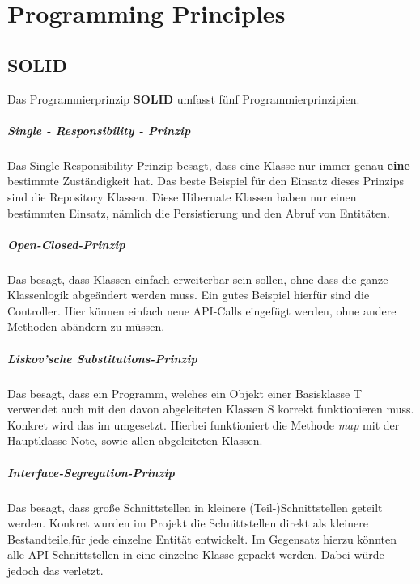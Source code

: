 \chapter{Programming Principles}

	\section{SOLID}
		Das Programmierprinzip \textbf{SOLID} umfasst fünf Programmierprinzipien.
		\paragraph{Single - Responsibility - Prinzip}
		Das Single-Responsibility Prinzip besagt, dass eine Klasse nur immer genau \textbf{eine} bestimmte Zuständigkeit hat. Das beste Beispiel für den Einsatz dieses Prinzips sind die Repository Klassen. Diese Hibernate Klassen haben nur einen bestimmten Einsatz, nämlich die Persistierung und den Abruf von Entitäten.
		\paragraph{Open-Closed-Prinzip}
		Das  besagt, dass Klassen einfach erweiterbar sein sollen, ohne dass die ganze Klassenlogik abgeändert werden muss. Ein gutes Beispiel hierfür sind die Controller. Hier können einfach neue API-Calls eingefügt werden, ohne andere Methoden abändern zu müssen.
		\paragraph{Liskov’sche Substitutions-Prinzip}
		Das  besagt, dass ein Programm, welches ein Objekt einer Basisklasse T verwendet auch mit den davon abgeleiteten Klassen S korrekt funktionieren muss. Konkret wird das im  umgesetzt. Hierbei funktioniert die Methode \textit{map} mit der Hauptklasse Note, sowie allen abgeleiteten Klassen.
		\paragraph{Interface-Segregation-Prinzip}
		Das  besagt, dass große Schnittstellen in kleinere (Teil-)Schnittstellen geteilt werden. Konkret wurden im Projekt die Schnittstellen direkt als kleinere Bestandteile,für jede einzelne Entität entwickelt. Im Gegensatz hierzu könnten alle API-Schnittstellen in eine einzelne Klasse gepackt werden. Dabei würde jedoch das  verletzt.
